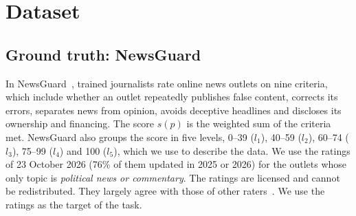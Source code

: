 \documentclass[11pt,a4paper]{article}
\begin{document}
\section{Dataset}\label{sec:data}

\subsection{Ground truth: NewsGuard}\label{sec:labels}
In NewsGuard~\cite{newsguard}, trained journalists rate online news outlets on nine criteria, which include whether an
outlet repeatedly publishes false content, corrects its errors, separates news from opinion, avoids deceptive headlines
and discloses its ownership and financing. The score $s(p)$ is the weighted sum of the criteria met. NewsGuard also
groups the score in five levels, 0--39 ($l_1$), 40--59 ($l_2$), 60--74 ($l_3$), 75--99 ($l_4$) and 100 ($l_5$), which we
use to describe the data. We use the ratings of 23 October 2026 (76\% of them updated in 2025 or 2026) for the outlets
whose only topic is \emph{political news or commentary}. The ratings are licensed and cannot be redistributed. They
largely agree with those of other raters~\cite{lin2023high}. We use the ratings as the target of the
task.
\end{document}

